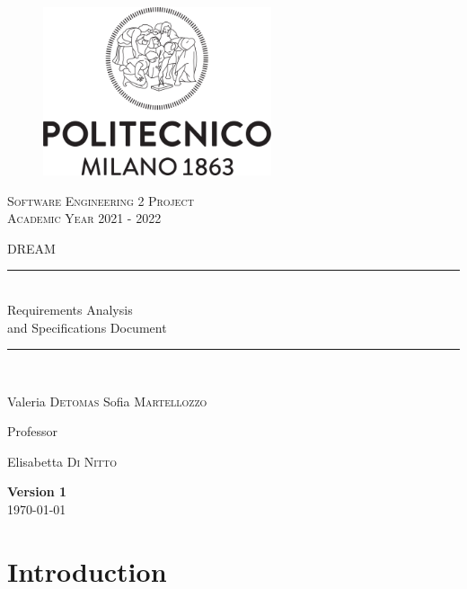 \documentclass{article}
\begin{document}
\begin{titlepage}
      \centering
      \begin{figure}
            \begin{center}
                  \includegraphics[width=0.6\textwidth]{images/logo_polimi.png}
            \end{center}
      \end{figure}
      \vfill
      {\scshape\LARGE Software Engineering 2 Project\\Academic Year 2021 - 2022 \par}
      \vspace{0.8cm}
      {\scshape\LARGE DREAM}
      \vfill
      \newcommand{\HRule}{\rule{\linewidth}{0.3mm}}
      \centering
      \HRule \\[0.4cm]
      \huge  Requirements Analysis\\ and Specifications Document\\%
      \HRule \\
      \vspace{1cm}
      {\Large Valeria \textsc{Detomas} \quad Sofia \textsc{Martellozzo} \par}
      \vfill
      {\large Professor\par
          Elisabetta \textsc{Di Nitto}}
      \vfill
      {\large \textbf{Version 1}\\ \today \par}
\end{titlepage}


\newpage
\renewcommand\contentsname{Contents}
\tableofcontents

\newpage

\section{Introduction}

\end{document}
